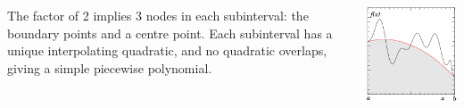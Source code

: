 \documentclass{beamer}
\begin{document}
\begin{frame}
\begin{columns}
\begin{column}{0.5\textwidth}
\begin{overlayarea}{\textwidth}{0.8\textheight}
{          \vspace{1ex}
          The factor of 2 implies 3 nodes in each
          subinterval: the boundary points and a centre point. Each
          subinterval has a unique interpolating quadratic, and no
          quadratic overlaps, giving a simple piecewise polynomial.
        }
      \end{overlayarea}
    \end{column}
    \begin{column}{0.5\textwidth}
      \begin{overlayarea}{\textwidth}{0.7\textheight}
        {
          \begin{center}
            \includegraphics[width=\textwidth]{figures/simpson1}
          \end{center}
        }
        {
          \begin{center}

\end{center}}
\end{overlayarea}
\end{column}
\end{columns}
\end{frame}
\end{document}
